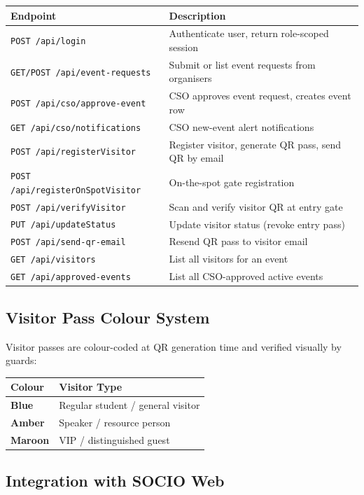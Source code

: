 \documentclass[12pt,a4paper]{article}
\begin{document}
\begin{tabularx}{\textwidth}{L{4.5cm} X}
\toprule
{}
\textbf{Endpoint} & \textbf{Description} \\
\midrule
\texttt{POST /api/login} & Authenticate user, return role-scoped session \\
\texttt{GET/POST /api/event-requests} & Submit or list event requests from organisers \\
\texttt{POST /api/cso/approve-event} & CSO approves event request, creates event row \\
\texttt{GET /api/cso/notifications} & CSO new-event alert notifications \\
\texttt{POST /api/registerVisitor} & Register visitor, generate QR pass, send QR by email \\
\texttt{POST /api/registerOnSpotVisitor} & On-the-spot gate registration \\
\texttt{POST /api/verifyVisitor} & Scan and verify visitor QR at entry gate \\
\texttt{PUT /api/updateStatus} & Update visitor status (revoke entry pass) \\
\texttt{POST /api/send-qr-email} & Resend QR pass to visitor email \\
\texttt{GET /api/visitors} & List all visitors for an event \\
\texttt{GET /api/approved-events} & List all CSO-approved active events \\
\bottomrule
\end{tabularx}

\subsection{Visitor Pass Colour System}

Visitor passes are colour-coded at QR generation time and verified visually by guards:

\begin{tabularx}{\textwidth}{L{3cm} X}
\toprule
{}
\textbf{Colour} & \textbf{Visitor Type} \\
\midrule
\textbf{Blue} & Regular student / general visitor \\
\textbf{Amber} & Speaker / resource person \\
\textbf{Maroon} & VIP / distinguished guest \\
\bottomrule
\end{tabularx}

\subsection{Integration with SOCIO Web}
\end{document}
